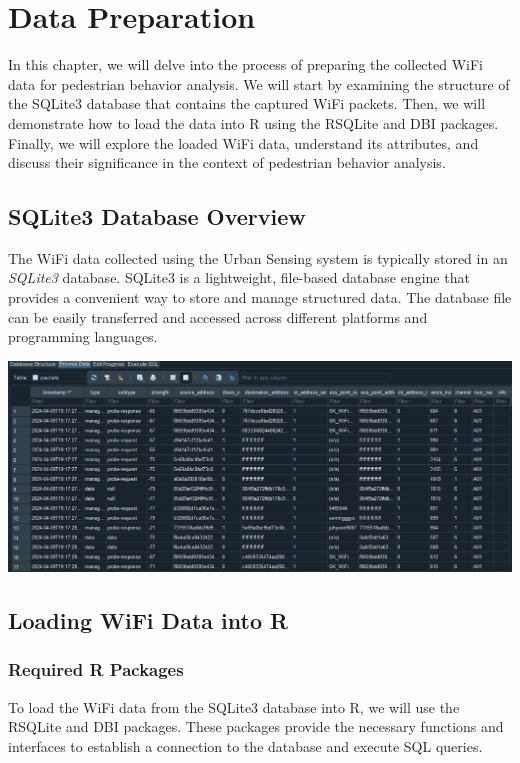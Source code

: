 \documentclass[
  letterpaper,
]{scrbook}
\begin{document}
\chapter{Data Preparation}\label{data-preparation}

In this chapter, we will delve into the process of preparing the
collected WiFi data for pedestrian behavior analysis. We will start by
examining the structure of the SQLite3 database that contains the
captured WiFi packets. Then, we will demonstrate how to load the data
into R using the RSQLite and DBI packages. Finally, we will explore the
loaded WiFi data, understand its attributes, and discuss their
significance in the context of pedestrian behavior analysis.

\section{SQLite3 Database Overview}\label{sqlite3-database-overview}

The WiFi data collected using the Urban Sensing system is typically
stored in an \emph{SQLite3} database. SQLite3 is a lightweight,
file-based database engine that provides a convenient way to store and
manage structured data. The database file can be easily transferred and
accessed across different platforms and programming languages.

\includegraphics{content/material/ch3/sqlite3_browser.png}

\section{Loading WiFi Data into R}\label{loading-wifi-data-into-r}

\subsection{Required R Packages}\label{required-r-packages}

To load the WiFi data from the SQLite3 database into R, we will use the
RSQLite and DBI packages. These packages provide the necessary functions
and interfaces to establish a connection to the database and execute SQL
queries.
\end{document}
